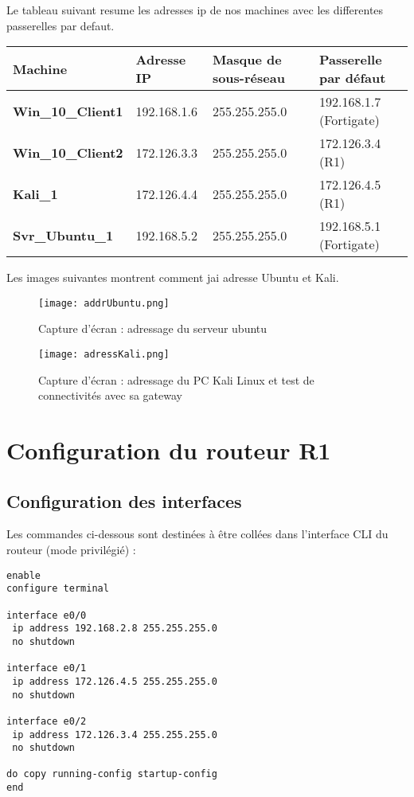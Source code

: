 \documentclass[11pt,a4paper]{report}
\begin{document}
Le tableau suivant resume les adresses ip de nos machines avec les differentes passerelles par defaut.\\

\begin{tabular}{|p{4cm}|p{3.5cm}|p{3.5cm}|p{4cm}|}
\hline

\textbf{Machine} & \textbf{Adresse IP} & \textbf{Masque de sous-réseau} & \textbf{Passerelle par défaut} \\
\hline
\textbf{Win\_10\_Client1} & 192.168.1.6 & 255.255.255.0 & 192.168.1.7 (Fortigate) \\
\hline
\textbf{Win\_10\_Client2} & 172.126.3.3 & 255.255.255.0 & 172.126.3.4 (R1) \\
\hline
\textbf{Kali\_1} & 172.126.4.4 & 255.255.255.0 & 172.126.4.5 (R1) \\
\hline
\textbf{Svr\_Ubuntu\_1} & 192.168.5.2 & 255.255.255.0 & 192.168.5.1 (Fortigate) \\
\hline
\end{tabular}


Les images suivantes montrent comment jai adresse Ubuntu et Kali. 
\begin{figure}[H]
\centering
\texttt{[image: addrUbuntu.png]}
\caption{Capture d'écran : adressage du serveur ubuntu}
\label{fig:addrUbuntu}
\end{figure}

\begin{figure}[H]
\centering
\texttt{[image: adressKali.png]}
\caption{Capture d'écran : adressage du PC Kali Linux et test de connectivités avec sa gateway}
\label{fig:addressKali}
\end{figure}
\chapter{Configuration du routeur R1}
\label{ch:routeur}

\section{Configuration des interfaces}
Les commandes ci-dessous sont destinées à être collées dans l'interface CLI du routeur (mode privilégié) :

\begin{lstlisting}[language={},caption={Configuration des interfaces - R1}]
enable
configure terminal

interface e0/0
 ip address 192.168.2.8 255.255.255.0
 no shutdown

interface e0/1
 ip address 172.126.4.5 255.255.255.0
 no shutdown

interface e0/2
 ip address 172.126.3.4 255.255.255.0
 no shutdown

do copy running-config startup-config
end
\end{lstlisting}
\end{document}
